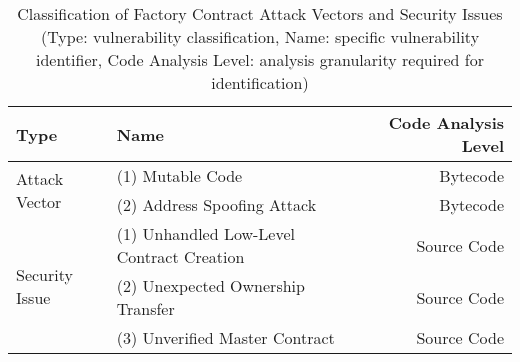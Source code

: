 \begin{table}[t]
	\centering
	\footnotesize
	\caption{Classification of Factory Contract Attack Vectors and Security Issues (Type:
	vulnerability classification, Name: specific vulnerability identifier, Code Analysis Level:
	analysis granularity required for identification)}
	\label{tab:attack-vector-security-issue}
	\begin{tabular}{@{}llr@{}}
		\toprule \textbf{Type}                   & \textbf{Name}                             & \textbf{Code Analysis Level} \\
		\midrule \multirow{2}{*}{Attack Vector}  & (1) Mutable Code                          & Bytecode                     \\
		                                         & (2) Address Spoofing Attack               & Bytecode                     \\
		\midrule \multirow{3}{*}{Security Issue} & (1) Unhandled Low-Level Contract Creation & Source Code                  \\
		                                         & (2) Unexpected Ownership Transfer         & Source Code                  \\
		                                         & (3) Unverified Master Contract            & Source Code                  \\
		\bottomrule
	\end{tabular}
\end{table}
